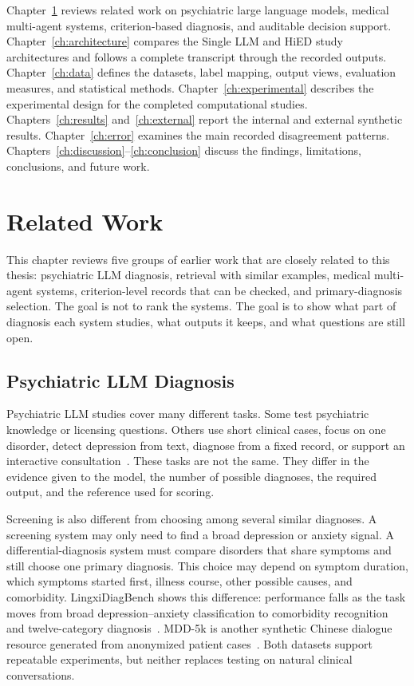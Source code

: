\documentclass[12pt,a4paper,oneside]{report}
\begin{document}
Chapter~\ref{ch:related} reviews related work on psychiatric large language models, medical multi-agent systems, criterion-based diagnosis, and auditable decision support. Chapter~\ref{ch:architecture} compares the Single LLM and HiED study architectures and follows a complete transcript through the recorded outputs. Chapter~\ref{ch:data} defines the datasets, label mapping, output views, evaluation measures, and statistical methods. Chapter~\ref{ch:experimental} describes the experimental design for the completed computational studies. Chapters~\ref{ch:results} and~\ref{ch:external} report the internal and external synthetic results. Chapter~\ref{ch:error} examines the main recorded disagreement patterns. Chapters~\ref{ch:discussion}--\ref{ch:conclusion} discuss the findings, limitations, conclusions, and future work.

\chapter{Related Work}
\label{ch:related}

This chapter reviews five groups of earlier work that are closely related to this thesis: psychiatric LLM diagnosis, retrieval with similar examples, medical multi-agent systems, criterion-level records that can be checked, and primary-diagnosis selection. The goal is not to rank the systems. The goal is to show what part of diagnosis each system studies, what outputs it keeps, and what questions are still open.

\section{Psychiatric LLM Diagnosis}

Psychiatric LLM studies cover many different tasks. Some test psychiatric knowledge or licensing questions. Others use short clinical cases, focus on one disorder, detect depression from text, diagnose from a fixed record, or support an interactive consultation~\citep{qiu2023largeai,li2024taiwan,raballo2025,sarma2025,li2025addreview,mcduff2025amie}. These tasks are not the same. They differ in the evidence given to the model, the number of possible diagnoses, the required output, and the reference used for scoring.

Screening is also different from choosing among several similar diagnoses. A screening system may only need to find a broad depression or anxiety signal. A differential-diagnosis system must compare disorders that share symptoms and still choose one primary diagnosis. This choice may depend on symptom duration, which symptoms started first, illness course, other possible causes, and comorbidity. LingxiDiagBench shows this difference: performance falls as the task moves from broad depression--anxiety classification to comorbidity recognition and twelve-category diagnosis~\citep{xu2026lingxidiagbench}. MDD-5k is another synthetic Chinese dialogue resource generated from anonymized patient cases~\citep{yin2024mdd5k}. Both datasets support repeatable experiments, but neither replaces testing on natural clinical conversations.
\end{document}
